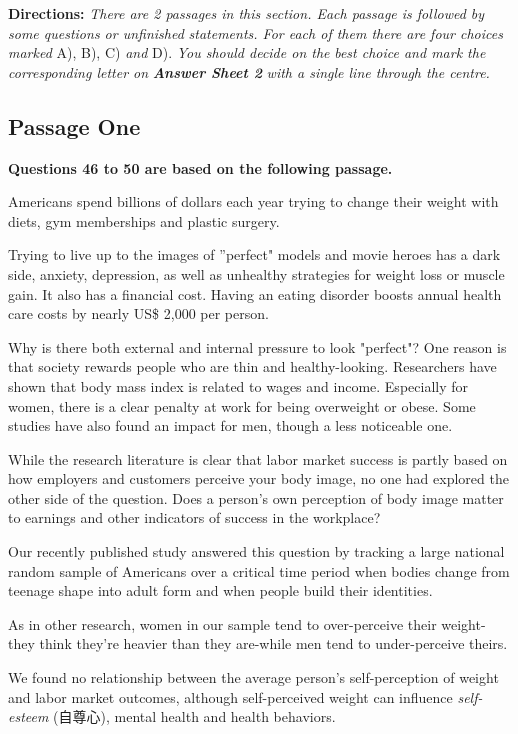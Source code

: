 \documentclass[UTF8,11pt]{ctexart}
\begin{document}
\textbf{Directions: }\textit{There are 2 passages in this section. Each passage is followed by some questions or unfinished} \textit{statements. For each of them there are four choices marked }A), B), C) \textit{and }D). \textit{You should decide on the} \textit{best choice and mark the corresponding letter on }\textbf{\textit{Answer Sheet 2 }}\textit{with a single line through the centre.}


\subsection*{\textbf{Passage One}}


\textbf{Questions 46 to 50 are based on the following passage.}


Americans spend billions of dollars each year trying to change their weight with diets, gym memberships and plastic surgery.


Trying to live up to the images of ''perfect" models and movie heroes has a dark side, anxiety, depression, as well as unhealthy strategies for weight loss or muscle gain. It also has a financial cost. Having an eating disorder boosts annual health care costs by nearly US\$ 2,000 per person.


Why is there both external and internal pressure to look "perfect"? One reason is that society rewards people who are thin and healthy-looking. Researchers have shown that body mass index is related to wages and income. Especially for women, there is a clear penalty at work for being overweight or obese. Some studies have also found an impact for men, though a less noticeable one.


While the research literature is clear that labor market success is partly based on how employers and customers perceive your body image, no one had explored the other side of the question. Does a person's own perception of body image matter to earnings and other indicators of success in the workplace?


Our recently published study answered this question by tracking a large national random sample of Americans over a critical time period when bodies change from teenage shape into adult form and when people build their identities.


As in other research, women in our sample tend to over-perceive their weight-they think they're heavier than they are-while men tend to under-perceive theirs.


We found no relationship between the average person's self-perception of weight and labor market outcomes, although self-perceived weight can influence \textit{self-esteem }(自尊心), mental health and health behaviors.
\end{document}
